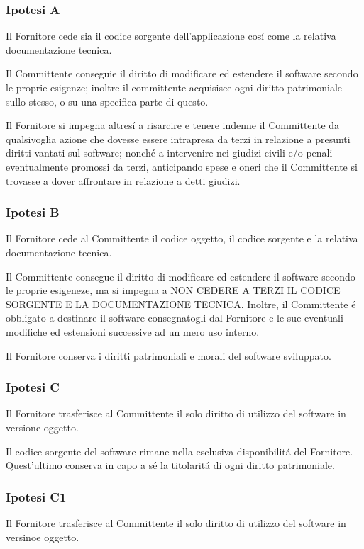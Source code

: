 \documentclass{article}
\begin{document}
\subsubsection*{Ipotesi A}
Il Fornitore cede sia il codice sorgente dell'applicazione cos\'i come la relativa documentazione tecnica.

Il Committente conseguie il diritto di modificare ed estendere il software secondo le proprie esigenze; inoltre il committente acquisisce ogni diritto patrimoniale sullo stesso, o su una specifica parte di questo.

Il Fornitore si impegna altres\'i a risarcire e tenere indenne il Committente da qualsivoglia azione che dovesse essere intrapresa da terzi in relazione a presunti diritti vantati sul software; nonch\'e a intervenire nei giudizi civili e/o penali eventualmente promossi da terzi, anticipando spese e oneri che il Committente si trovasse a dover affrontare in relazione a detti giudizi.

\subsubsection*{Ipotesi B}
Il Fornitore cede al Committente il codice oggetto, il codice sorgente e la relativa documentazione tecnica. 

Il Committente consegue il diritto di modificare ed estendere il software secondo le proprie esigeneze, ma si impegna a NON CEDERE A TERZI IL CODICE SORGENTE E LA DOCUMENTAZIONE TECNICA. Inoltre, il Committente \'e obbligato a destinare il software consegnatogli dal Fornitore e le sue eventuali modifiche ed estensioni successive ad un mero uso interno.

Il Fornitore conserva i diritti patrimoniali e morali del software sviluppato.

\subsubsection{Ipotesi C}
Il Fornitore trasferisce al Committente il solo diritto di utilizzo del software in versione oggetto. 

Il codice sorgente del software rimane nella esclusiva disponibilit\'a del Fornitore. Quest'ultimo conserva in capo a s\'e la titolarit\'a di ogni diritto patrimoniale.

\subsubsection{Ipotesi C1}
Il Fornitore trasferisce al Committente il solo diritto di utilizzo del software in versinoe oggetto.
\end{document}
